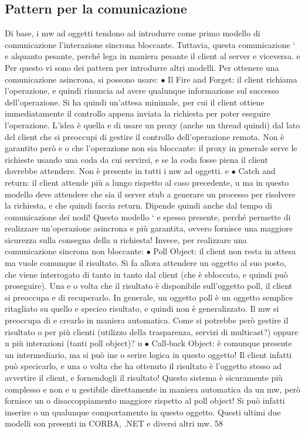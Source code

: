 \subsection{Pattern per la comunicazione}
Di base, i mw ad oggetti tendono ad introdurre come primo modello di comunicazione l'interazione sincrona bloccante.
Tuttavia, questa comunicazione `
e
alquanto pesante, perché lega in maniera pesante il client al server e viceversa.
e
Per questo vi sono dei pattern per introdurre altri modelli.
Per ottenere una comunicazione asincrona, si possono usare:
$\bullet$ Il Fire and Forget: il client richiama l'operazione, e quindi rinuncia ad
avere qualunque informazione sul successo dell'operazione. Si ha quindi
un'attesa minimale, per cui il client ottiene immediatamente il controllo
appena inviata la richiesta per poter eseguire l'operazione. L'idea è quella
e
di usare un proxy (anche un thread quindi) dal lato del client che si preoccupi di gestire il controllo dell'operazione
remota. Non è garantito però
e
o
che l'operazione non sia bloccante: il proxy in generale serve le richieste
usando una coda da cui servirsi, e se la coda fosse piena il client dovrebbe
attendere. Non è presente in tutti i mw ad oggetti.
e
$\bullet$ Catch and return: il client attende più a lungo rispetto al caso precedente,
u
ma in questo modello deve attendere che sia il server stub a generare un
processo per risolvere la richiesta, e che quindi faccia return. Dipende
quindi anche dal tempo di comunicazione dei nodi! Questo modello `
e
spesso presente, perché permette di realizzare un'operazione asincrona
e
più garantita, ovvero fornisce una maggiore sicurezza sulla consegna della
u
richiesta!
Invece, per realizzare una comunicazione sincrona non bloccante:
$\bullet$ Poll Object: il client non resta in attesa ma vuole comunque il risultato.
Si fa allora attendere un oggetto al suo posto, che viene interrogato di
tanto in tanto dal client (che è sbloccato, e quindi può proseguire). Una
e
o
volta che il risultato è disponibile sull'oggetto poll, il client si preoccupa
e
di recuperarlo.
In generale, un oggetto poll è un oggetto semplice ritagliato su quello
e
specico risultato, e quindi non è generalizzato. Il mw si preoccupa di
e
crearlo in maniera automatica. Come si potrebbe però gestire il risultato
o
per più clienti (utilizzo della trasparenza, servizi di multicast?) oppure
u
più interazioni (tanti poll object)?
u
$\bullet$ Call-back Object: è comunque presente un intermediario, ma si può ine
o
serire logica in questo oggetto! Il client infatti può specicarlo, e una
o
volta che ha ottenuto il risultato è l'oggetto stesso ad avvertire il client,
e
fornendogli il risultato! Questo sistema è sicuramente più complesso e non
e
u
gestibile direttamente in maniera automatica da un mw, però fornisce un
o
disaccoppiamento maggiore rispetto al poll object! Si può infatti inserire
o
un qualunque comportamento in questo oggetto.
Questi ultimi due modelli son presenti in CORBA, .NET e diversi altri mw.
58
